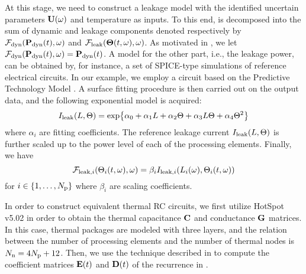At this stage, we need to construct a leakage model with the identified uncertain parameters $\mathbf{U}(\omega)$ and temperature as inputs. To this end,  is decomposed into the sum of dynamic and leakage components denoted respectively by $\mathcal{F}_{\text{dyn}}(\mathbf{P}_{\text{dyn}}(t), \omega)$ and $\mathcal{F}_{\text{leak}}({\boldsymbol\Theta}(t, \omega), \omega)$. As motivated in , we let $\mathcal{F}_{\text{dyn}}(\mathbf{P}_{\text{dyn}}(t), \omega) = \mathbf{P}_{\text{dyn}}(t)$. A model for the other part, i.e., the leakage power, can be obtained by, for instance, a set of SPICE-type simulations of reference electrical circuits. In our example, we employ a circuit based on the Predictive Technology Model \cite{ptm}. A surface fitting procedure is then carried out on the output data, and the following exponential model is acquired:
\begin{equation} \elabel{leakage-current}
  I_\leak(\Leff, \T) = \text{exp} \big\{ \alpha_0 + \alpha_1 \Leff + \alpha_2 \T + \alpha_3 \Leff \T + \alpha_4 \T^2 \big\}
\end{equation}
where $\alpha_i$ are fitting coefficients. The reference leakage current $I_{\text{leak}}(L, \Theta)$ is further scaled up to the power level of each of the processing elements. Finally, we have
\[
  \mathcal{F}_{\text{leak}, i}(\Theta_i(t, \omega), \omega) = \beta_i I_{\text{leak}, i}(L_i(\omega), \Theta_i(t, \omega))
\]
for $i \in \{ 1, \dotsc, {N_\text{p}} \}$ where $\beta_i$ are scaling coefficients.

In order to construct equivalent thermal RC circuits, we first utilize HotSpot v5.02 \cite{hotspot} in order to obtain the thermal capacitance $\mC$ and conductance $\mG$ matrices. In this case, thermal packages are modeled with three layers, and the relation between the number of processing elements and the number of thermal nodes is $N_\text{n} = 4 {N_\text{p}} + 12$. Then, we use the technique described in \cite{ukhov2012} to compute the coefficient matrices $\mE(\t)$ and $\mD(\t)$ of the recurrence in .

